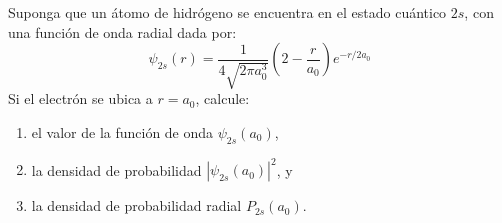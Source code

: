 \item Suponga que un átomo de hidrógeno se encuentra en el estado cuántico $2s$, con una función de onda radial dada por:
$$ \psi_{2s}(r) = \frac{1}{4\sqrt{2\pi a_0^3}} \left( 2 - \frac{r}{a_0} \right) e^{-r/2a_0} $$
Si el electrón se ubica a $r = a_0$, calcule:
\begin{enumerate}
    \item el valor de la función de onda $\psi_{2s}(a_0)$,
    \item la densidad de probabilidad $\left|\psi_{2s}(a_0)\right|^2$, y
    \item la densidad de probabilidad radial $P_{2s}(a_0)$.
\end{enumerate}